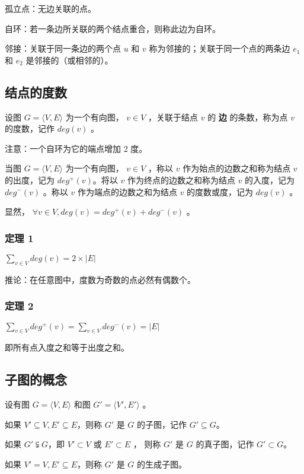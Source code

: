 孤立点：无边关联的点。

自环：若一条边所关联的两个结点重合，则称此边为自环。

邻接：关联于同一条边的两个点 $u$ 和 $v$ 称为邻接的；关联于同一个点的两条边 $e_1$ 和 $e_2$ 是邻接的（或相邻的）。

\subsection{结点的度数}

设图 $G= \langle V,E\rangle$ 为一个有向图， $v\in V$ ，关联于结点 $v$ 的 \textbf{边} 的条数，称为点 $v$ 的度数，记作 $deg(v)$ 。

注意：一个自环为它的端点增加 2 度。

当图 $G= \langle V,E\rangle$ 为一个有向图， $v\in V$ ，称以 $v$ 作为始点的边数之和称为结点 $v$ 的出度，记为 $deg^{+} (v)$。将以 $v$ 作为终点的边数之和称为结点 $v$ 的入度，记为 $deg^{-} (v)$ 。称以 $v$ 作为端点的边数之和为结点 $v$ 的度数或度，记为 $deg(v)$ 。

显然， $\forall v\in V,deg(v)=deg^{+} (v)+deg^{-} (v)$ 。

\subsubsection{定理 1}

$\sum_{v\in V} deg(v)=2\times |E|$ 

推论：在任意图中，度数为奇数的点必然有偶数个。

\subsubsection{定理 2}

$\sum_{v\in V} deg^{+} (v)=\sum_{v\in V} deg^{-} (v)=|E|$

即所有点入度之和等于出度之和。

\subsection{子图的概念}

设有图 $G= \langle V,E\rangle$ 和图 $G'= \langle V',E'\rangle$ 。

如果 $V'\subseteq V,E'\subseteq E$，则称 $G'$ 是 $G$ 的子图，记作 $G'\subseteq G$。

如果 $G'\subsetneqq G$，即 $V'\subset V$ 或 $E'\subset E$ ， 则称 $G'$ 是 $G$ 的真子图，记作 $G'\subset G$。

如果 $V'=V,E'\subseteq E$，则称 $G'$ 是 $G$ 的生成子图。

